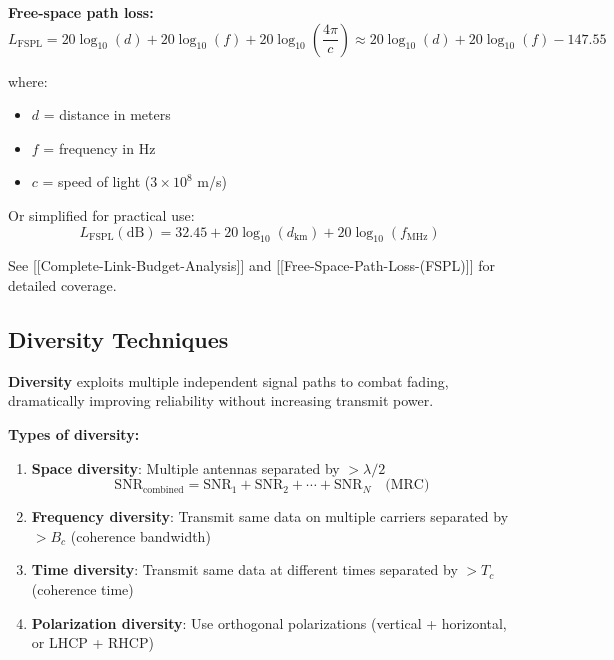 \textbf{Free-space path loss:}
\begin{equation}
L_{\text{FSPL}} = 20\log_{10}(d) + 20\log_{10}(f) + 20\log_{10}\left(\frac{4\pi}{c}\right) \approx 20\log_{10}(d) + 20\log_{10}(f) - 147.55
\label{eq:fspl}
\end{equation}

where:
\begin{itemize}
\item $d$ = distance in meters
\item $f$ = frequency in Hz
\item $c$ = speed of light ($3 \times 10^8$ m/s)
\end{itemize}

Or simplified for practical use:
\begin{equation}
L_{\text{FSPL}}(\text{dB}) = 32.45 + 20\log_{10}(d_{\text{km}}) + 20\log_{10}(f_{\text{MHz}})
\label{eq:fspl_simple}
\end{equation}

See {[}{[}Complete-Link-Budget-Analysis{]}{]} and {[}{[}Free-Space-Path-Loss-(FSPL){]}{]} for detailed coverage.

\subsection{Diversity Techniques}

\textbf{Diversity} exploits multiple independent signal paths to combat fading, dramatically improving reliability without increasing transmit power.

\textbf{Types of diversity:}

\begin{enumerate}
\item \textbf{Space diversity}: Multiple antennas separated by $> \lambda/2$
\begin{equation}
\text{SNR}_{\text{combined}} = \text{SNR}_1 + \text{SNR}_2 + \cdots + \text{SNR}_N \quad \text{(MRC)}
\label{eq:mrc}
\end{equation}

\item \textbf{Frequency diversity}: Transmit same data on multiple carriers separated by $> B_c$ (coherence bandwidth)

\item \textbf{Time diversity}: Transmit same data at different times separated by $> T_c$ (coherence time)

\item \textbf{Polarization diversity}: Use orthogonal polarizations (vertical + horizontal, or LHCP + RHCP)
\end{enumerate}


